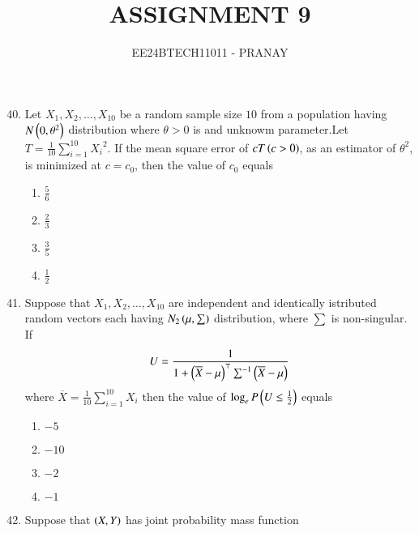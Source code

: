 \documentclass[journal,12pt,onecolumn]{IEEEtran}
\theoremstyle{remark}
\begin{document}

\vspace{3cm}

\title{ASSIGNMENT 9}
\author{EE24BTECH11011 - PRANAY}
\maketitle

\bigskip

\renewcommand{\thefigure}{\theenumi}
\renewcommand{\thetable}{\theenumi}
\begin{enumerate}\setcounter{enumi}{39}
\item Let $X_1,X_2,\dots,X_{10}$ be a random sample size $10$ from a population having $N\left(0,\theta^2\right)$ distribution where $\theta > 0$ is and unknowm parameter.Let $T = \frac{1}{10}\sum_{i=1}^{10} {X_i}^2$. If the mean square error of $cT\left(c>0\right)$, as an estimator of $\theta^2$, is minimized at $c = c_0$, then the value of $c_0$ equals
\begin{multicols}{4}
\begin{enumerate}
    \item $\frac{5}{6}$
    \item $\frac{2}{3}$
    \item $\frac{3}{5}$
    \item $\frac{1}{2}$
\end{enumerate}
\end{multicols}
\item Suppose that $X_1,X_2,\dots,X_{10}$ are independent and identically istributed random
vectors each having $N_2\left(\mu , \sum\right)$ distribution, where $\sum$ is non-singular. If
\begin{align}
    U = \frac{1}{1+\left(\overline{X}-\mu\right)^\top \sum^{-1}\left(\overline{X}-\mu\right)}
\end{align}
where $\overline{X} = \frac{1}{10}\sum_{i=1}^{10}X_i$ then the value of $\log_e P\left(U \leq \frac{1}{2}\right)$ equals
\begin{multicols}{4}
    \begin{enumerate}
        \item $-5$
        \item $-10$
        \item $-2$
        \item $-1$
    \end{enumerate}
\end{multicols}
\item Suppose that $\left(X, Y\right)$ has joint probability mass function

\end{enumerate}
\end{document}
